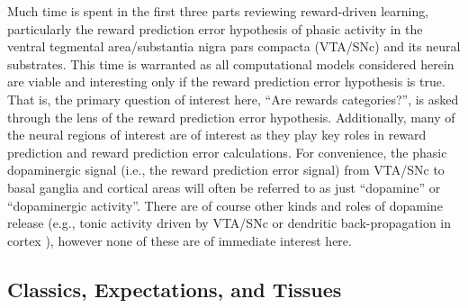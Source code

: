 \documentclass[doc,12pt]{apa}        %
\begin{document}
Much time is spent in the first three parts reviewing reward-driven learning, particularly the reward prediction error hypothesis of phasic activity in the ventral tegmental area/substantia nigra pars compacta (VTA/SNc) and its neural substrates.  This time is warranted as all computational models considered herein are viable and interesting only if the reward prediction error hypothesis is true.  That is, the primary question of interest here, ``Are rewards categories?'', is asked through the lens of the reward prediction error hypothesis.  Additionally, many of the neural regions of interest are of interest as they play key roles in reward prediction and reward prediction error calculations.  For convenience, the phasic dopaminergic signal (i.e., the reward prediction error signal) from VTA/SNc to basal ganglia and cortical areas will often be referred to as just ``dopamine'' or ``dopaminergic activity''.  There are of course other kinds and roles of dopamine release (e.g., tonic activity driven by VTA/SNc \cite{schultz:2007aa} or dendritic back-propagation in cortex \cite{jay:2003aa}), however none of these are of immediate interest here.

\subsection{Classics, Expectations, and Tissues} %
\label{sub:cet}
\end{document}
